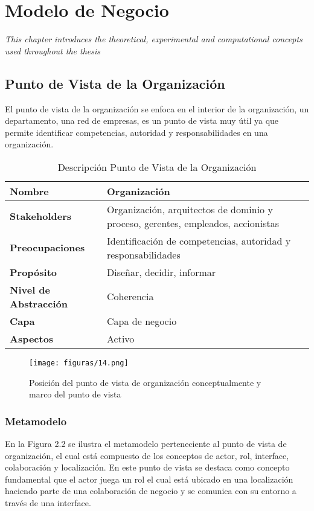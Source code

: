 \chapter{Modelo de Negocio}
\label{chap:Negocio}
\textit{This chapter introduces the theoretical, experimental and computational concepts used throughout the thesis}
\vspace{2ex}\vfill
\minitoc
\newpage

\section{Punto de Vista de la Organización}
 El punto de vista de la organización se enfoca en el interior de la organización, un departamento, una red de empresas, es un punto de vista muy útil ya que permite identificar  competencias, autoridad y responsabilidades en una organización.
 
  \begin{table}[!h]
	\centering
	\begin{tabular}{lp{8cm}}
		\toprule
		\textbf{Nombre} & \textbf{Organización} \\
		\midrule
		\textbf{Stakeholders} & Organización, arquitectos de dominio y proceso, gerentes, empleados, accionistas \\
		\textbf{Preocupaciones} & Identificación de competencias, autoridad y responsabilidades \\
		\textbf{Propósito} & Diseñar, decidir, informar \\
		\textbf{Nivel de Abstracción} & Coherencia \\
		\textbf{Capa} & Capa de negocio \\
		\textbf{Aspectos} & Activo \\
		\bottomrule
	\end{tabular}
	\captionsetup{width=.95\textwidth}
	\caption{Descripción Punto de Vista de la Organización}
	\label{tabla4}
  \end{table}

  \begin{figure}[!h]
 	\centering
 	\texttt{[image: figuras/14.png]}
 	\captionsetup{width=.95\textwidth}
 	\caption{Posición del punto de vista de organización conceptualmente y marco del punto de vista}
 	\label{figura14}
  \end{figure}

  \subsection{Metamodelo}
  En la Figura 2.2 se ilustra el metamodelo perteneciente al punto de vista de organización, el cual está compuesto de los conceptos de actor, rol, interface, colaboración y localización. En este punto de vista se destaca como concepto fundamental que el actor juega un rol el cual está ubicado en una localización haciendo parte de una colaboración de negocio y se comunica con su entorno a través de una interface.
 
